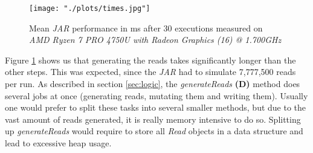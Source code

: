 \documentclass[12pt]{article}
\begin{document}

\begin{figure}[htpb]
    \centering
    \texttt{[image: "./plots/times.jpg"]}
    \caption{Mean \textit{JAR} performance in ms after 30 executions measured on \textit{AMD Ryzen 7 PRO 4750U with Radeon Graphics (16) @ 1.700GHz}}
    \label{fig:-plots-times-jpg}
\end{figure}

Figure \ref{fig:-plots-times-jpg} shows us that generating the reads takes significantly longer than the other steps. This was expected, since
the \textit{JAR} had to simulate 7,777,500 reads per run. As described in section \ref{sec:logic}, the \textit{generateReads} \textbf{(D)} method
does several jobs at once (generating reads, mutating them and writing them). Usually one would prefer to split these tasks into several 
smaller methods, but due to the vast amount of reads generated, it is really memory intensive to do so. Splitting up
\textit{generateReads} would require to store all \textit{Read} objects in a data structure and lead to excessive heap usage.

\end{document}
